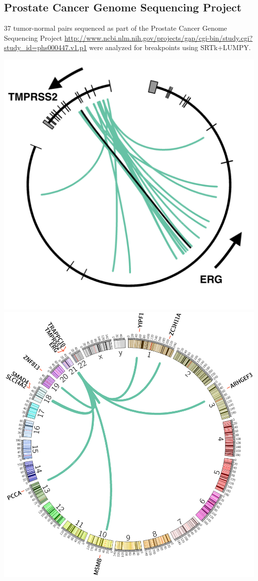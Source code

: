 \documentclass[a0,final]{a0poster}
\begin{document}
\begin{multicols}{2}
\section*{Prostate Cancer Genome Sequencing Project}

37 tumor-normal pairs sequenced as part of the Prostate Cancer
Genome Sequencing Project \url{http://www.ncbi.nlm.nih.gov/projects/gap/cgi-bin/study.cgi?study_id=phs000447.v1.p1} were analyzed for breakpoints using SRTk+LUMPY.

{
\centering
\includegraphics[scale = 0.18]{TMPRSS2_ERG/circos.png} 
\hspace{40mm}
\includegraphics[scale = 0.18]{TMPRSS2_breakpoints/circos.png}
}
\end{multicols}
\end{document}
